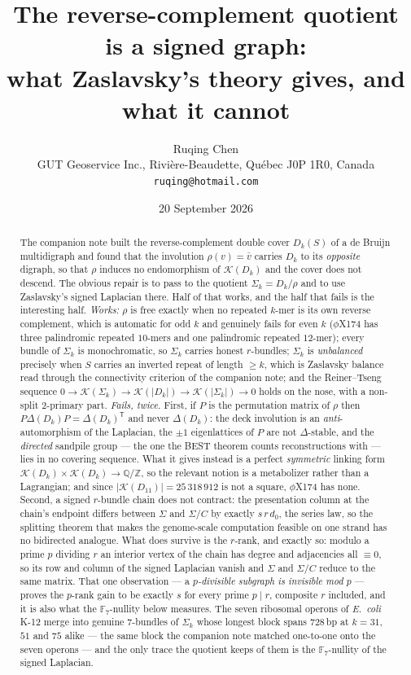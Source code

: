 \documentclass[11pt]{article}
\title{\bfseries The reverse-complement quotient is a signed graph:\\
what Zaslavsky's theory gives, and what it cannot}
\author{Ruqing Chen\\[2pt]
\normalsize GUT Geoservice Inc., Rivi\`ere-Beaudette, Qu\'ebec J0P 1R0, Canada\\
\normalsize\texttt{ruqing@hotmail.com}}
\date{20 September 2026}
\theoremstyle{plain}
\theoremstyle{definition}
\theoremstyle{remark}
\newcommand{\Z}{\mathbb{Z}}
\newcommand{\Q}{\mathbb{Q}}
\newcommand{\K}{\mathcal{K}}
\newcommand{\Sig}{\Sigma}
\begin{document}
\maketitle

\begin{abstract}
\noindent
The companion note built the reverse-complement double cover $D_k(S)$ of a de Bruijn
multidigraph and found that the involution $\rho(v)=\bar v$ carries $D_k$ to its
\emph{opposite} digraph, so that $\rho$ induces no endomorphism of $\K(D_k)$ and the cover
does not descend. The obvious repair is to pass to the quotient $\Sig_k=D_k/\rho$ and to use
Zaslavsky's signed Laplacian there. Half of that works, and the half that fails is the
interesting half. \emph{Works:} $\rho$ is free exactly when no repeated $k$-mer is its own
reverse complement, which is automatic for odd $k$ and genuinely fails for even $k$
($\phi$X174 has three palindromic repeated $10$-mers and one palindromic repeated $12$-mer);
every bundle of $\Sig_k$ is monochromatic, so $\Sig_k$ carries honest $r$-bundles; $\Sig_k$
is \emph{unbalanced} precisely when $S$ carries an inverted repeat of length $\ge k$, which
is Zaslavsky balance read through the connectivity criterion of the companion note; and the
Reiner--Tseng sequence
$0\to\K(\Sig_k)\to\K(|D_k|)\to\K(|\Sig_k|)\to 0$
holds on the nose, with a non-split $2$-primary part.
\emph{Fails, twice.} First, if $P$ is the permutation matrix of $\rho$ then
$P\Delta(D_k)P=\Delta(D_k)^{\mathsf T}$ and never $\Delta(D_k)$: the deck involution is an
\emph{anti}-automorphism of the Laplacian, the $\pm1$ eigenlattices of $P$ are not
$\Delta$-stable, and the \emph{directed} sandpile group --- the one the BEST theorem counts
reconstructions with --- lies in no covering sequence. What it gives instead is a perfect
\emph{symmetric} linking form $\K(D_k)\times\K(D_k)\to\Q/\Z$, so the relevant notion is a
metabolizer rather than a Lagrangian; and since $|\K(D_{11})|=25\,318\,912$ is not a square,
$\phi$X174 has none. Second, a signed $r$-bundle chain does
not contract: the presentation column at the chain's endpoint differs between $\Sig$ and
$\Sig/C$ by exactly $s\,r\,d_0$, the series law, so the splitting theorem that makes the
genome-scale computation feasible on one strand has no bidirected analogue. What does survive
is the $r$-rank, and exactly so: modulo a prime $p$ dividing $r$ an interior vertex of the
chain has degree and adjacencies all $\equiv0$, so its row and column of the signed Laplacian
vanish and $\Sig$ and $\Sig/C$ reduce to the same matrix. That one observation --- a
\emph{$p$-divisible subgraph is invisible mod $p$} --- proves the $p$-rank gain to be exactly
$s$ for every prime $p\mid r$, composite $r$ included, and it is also what the
$\mathbb{F}_7$-nullity below measures.
The seven ribosomal operons of \emph{E.\ coli} K-12 merge into genuine
$7$-bundles of $\Sig_k$ whose longest block spans $728$\,bp at $k=31$, $51$ and $75$ alike ---
the same block the companion note matched one-to-one onto the seven operons --- and the only
trace the quotient keeps of them is the $\mathbb{F}_7$-nullity of the signed Laplacian.
\end{abstract}
\end{document}
